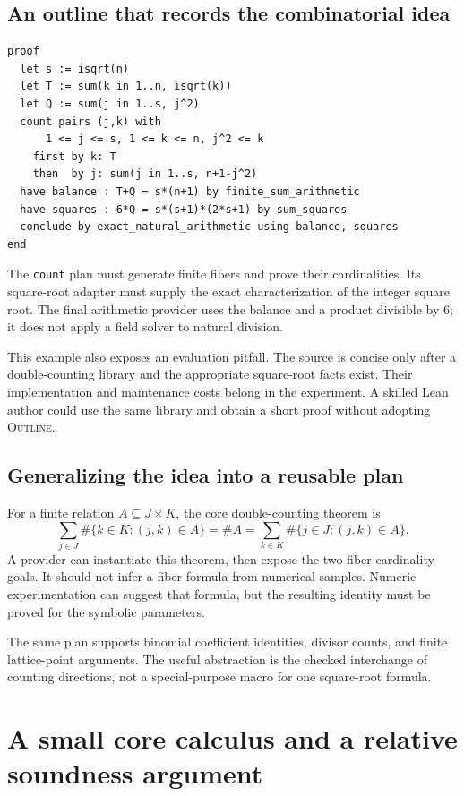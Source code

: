 \documentclass[11pt,a4paper]{article}
\newcommand{\code}[1]{\nolinkurl{#1}}
\newcommand{\Outline}{\textsc{Outline}}
\theoremstyle{definition}
\theoremstyle{remark}
\numberwithin{equation}{section}
\begin{document}
\subsection{An outline that records the combinatorial idea}
\begin{lstlisting}
proof
  let s := isqrt(n)
  let T := sum(k in 1..n, isqrt(k))
  let Q := sum(j in 1..s, j^2)
  count pairs (j,k) with
      1 <= j <= s, 1 <= k <= n, j^2 <= k
    first by k: T
    then  by j: sum(j in 1..s, n+1-j^2)
  have balance : T+Q = s*(n+1) by finite_sum_arithmetic
  have squares : 6*Q = s*(s+1)*(2*s+1) by sum_squares
  conclude by exact_natural_arithmetic using balance, squares
end
\end{lstlisting}
The \code{count} plan must generate finite fibers and prove their cardinalities. Its square-root adapter must supply the exact characterization of the integer square root. The final arithmetic provider uses the balance and a product divisible by $6$; it does not apply a field solver to natural division.

This example also exposes an evaluation pitfall. The source is concise only after a double-counting library and the appropriate square-root facts exist. Their implementation and maintenance costs belong in the experiment. A skilled Lean author could use the same library and obtain a short proof without adopting \Outline.

\subsection{Generalizing the idea into a reusable plan}
For a finite relation $A\subseteq J\times K$, the core double-counting theorem is
\[
 \sum_{j\in J}\#\{k\in K:(j,k)\in A\}
 =\#A
 =\sum_{k\in K}\#\{j\in J:(j,k)\in A\}.
\]
A provider can instantiate this theorem, then expose the two fiber-cardinality goals. It should not infer a fiber formula from numerical samples. Numeric experimentation can suggest that formula, but the resulting identity must be proved for the symbolic parameters.

The same plan supports binomial coefficient identities, divisor counts, and finite lattice-point arguments. The useful abstraction is the checked interchange of counting directions, not a special-purpose macro for one square-root formula.

\section{A small core calculus and a relative soundness argument}
\label{sec:semantics}
\end{document}
